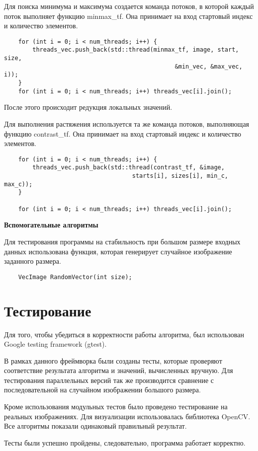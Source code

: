 \documentclass{report}
\begin{document}
    Для поиска минимума и максимума создается команда потоков, в которой каждый поток выполняет функцию minmax\_tf. Она принимает на вход стартовый индекс и количество элементов.
    \begin{lstlisting}
    for (int i = 0; i < num_threads; i++) {
        threads_vec.push_back(std::thread(minmax_tf, image, start, size,
                                                &min_vec, &max_vec, i));
    }
    for (int i = 0; i < num_threads; i++) threads_vec[i].join();
    \end{lstlisting}
    \par После этого происходит редукция локальных значений.
    \par Для выполнения растяжения используется та же команда потоков, выполняющая функцию contrast\_tf. Она принимает на вход стартовый индекс и количество элементов.
    \begin{lstlisting}
    for (int i = 0; i < num_threads; i++) {
        threads_vec.push_back(std::thread(contrast_tf, &image,
                                    starts[i], sizes[i], min_c, max_c));
    }

    for (int i = 0; i < num_threads; i++) threads_vec[i].join();
    \end{lstlisting}
    \textbf{Вспомогательные алгоритмы}
    \par Для тестирования программы на стабильность при большом размере входных данных использована функция, которая генерирует случайное изображение заданного размера.
    \begin{lstlisting}
    VecImage RandomVector(int size);
    \end{lstlisting}
    
    \newpage
    \section*{Тестирование}
    \par Для того, чтобы убедиться в корректности работы алгоритма, был использован Google testing framework (gtest).
    \par В рамках данного фреймворка были созданы тесты, которые проверяют соответствие результата алгоритма и значений, вычисленных вручную. Для тестирования параллельных версий так же производится сравнение с последовательной на случайном изображении большого размера.
    \par Кроме использования модульных тестов было проведено тестирование на реальных изображениях. Для визуализации использовалась библиотека OpenCV. Все алгоритмы показали одинаковый правильный результат.
    \par Тесты были успешно пройдены, следовательно, программа работает корректно.
    
\end{document}
